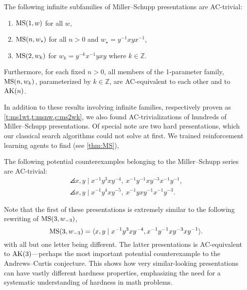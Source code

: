 \begin{introtheorem}
        The following infinite subfamilies of Miller--Schupp presentations are AC-trivial:
        \begin{enumerate}[label=(\roman*)]
            \item $\text{MS}(1, w)$ for all $w$,
            \item $\text{MS}(n, w_\star)$ for all $n > 0$ and $w_\star = y^{-1} x y x^{-1}$, 
            \item $\text{MS}(2, w_k)$ for $w_k = y^{-k} x^{-1} y x y$ where $k \in \mathbb{Z}$.
        \end{enumerate}
        Furthermore, for each fixed $n > 0$, all members of the 1-parameter family, $\text{MS}(n, w_k)$, parameterized by $k \in \mathbb{Z}$, are AC-equivalent to each other and to $\text{AK}(n)$.
\end{introtheorem}

In addition to these results involving infinite families, respectively proven as \cref{t:ms1wt,t:msnw,c:ms2wk}, we also found AC-trivializations of hundreds of Miller--Schupp presentations.  Of special note are two hard presentations, which our classical search algorithms could not solve at first. We trained reinforcement learning agents to find (see \cref{thm:MS}),

\begin{introtheorem}
    The following potential counterexamples belonging to the Miller--Schupp series are AC-trivial:
	\begin{gather*}
		\angles{x, y \mid x^{-1} y^3 x y^{-4} , \ x^{-1} y^{-1} x y^{-3} x^{-1} y^{-1}}, \\
		\angles{x, y \mid x^{-1} y^4 x y^{-5} , \ x^{-1} y x y^{-1} x^{-1} y^{-3}}.
	\end{gather*}
\end{introtheorem}


Note that the first of these presentations is extremely similar to the following rewriting of $\text{MS}(3, w_{-3})$,
\[
\text{MS}(3, w_{-3}) = \langle x, y \mid x^{-1} y^3 x y^{-4}, x^{-1} y^{-1} x y^{-3} x y^{-1}\rangle.
\]
with all but one letter being different. The latter presentations is AC-equivalent to $\text{AK}(3)$---perhaps the most important potential counterexample to the Andrews--Curtis conjecture.
This shows how very similar-looking presentations can have vastly different hardness properties, emphasizing the need for a systematic understanding of hardness in math problems.

